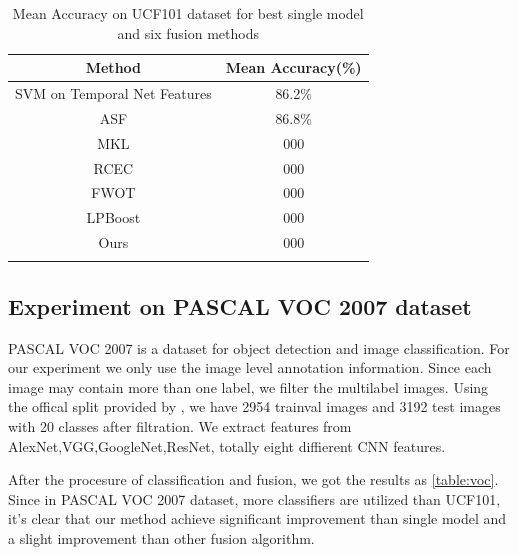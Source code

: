 \documentclass[letterpaper]{article}
\begin{document}
\begin{table}[h]\small
\centering
\label{table:ucf101}
\begin{tabular}{c|c}
\hline
Method & Mean Accuracy(\%) \\\hline
SVM on Temporal Net Features & 86.2\% \\\hline
ASF &  86.8\% \\
MKL &  000 \\
RCEC &  000 \\
FWOT &  000 \\
LPBoost &  000 \\\hline
Ours &  000 \\
\hline
\caption{Mean Accuracy on UCF101 dataset for best single model and six fusion methods}
\end{tabular}
\end{table}

\subsection{Experiment on PASCAL VOC 2007 dataset}
PASCAL VOC 2007 is a dataset for object detection and image classification. For our experiment we only use the image level annotation information. Since each image may contain more than one label, we filter the multilabel images. Using the offical split provided by \cite{pascal-voc-2007}, we have 2954 trainval images and 3192 test images with 20 classes after filtration. We extract features from AlexNet,VGG,GoogleNet,ResNet, totally eight diffierent CNN features.

After the procesure of classification and fusion, we got the results as \ref{table:voc}. Since in PASCAL VOC 2007 dataset, more classifiers are utilized than UCF101, it's clear that our method achieve significant improvement than single model and a slight improvement than other fusion algorithm.
\end{document}
